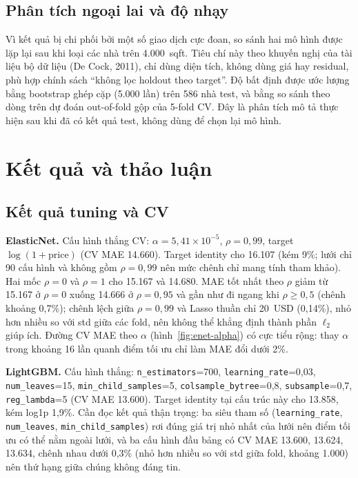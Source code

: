 \subsection{Phân tích ngoại lai và độ nhạy}

Vì kết quả bị chi phối bởi một số giao dịch cực đoan, so sánh hai mô hình được lặp lại sau khi loại các nhà trên
4.000~sqft. Tiêu chí này theo khuyến nghị của tài liệu bộ dữ liệu (De Cock, 2011), chỉ dùng diện tích, không dùng
giá hay residual, phù hợp chính sách ``không lọc holdout theo target''. Độ bất định được ước lượng bằng bootstrap
ghép cặp (5.000 lần) trên 586 nhà test, và bằng so sánh theo dòng trên dự đoán out-of-fold gộp của 5-fold CV. Đây
là phân tích mô tả thực hiện sau khi đã có kết quả test, không dùng để chọn lại mô hình.

\section{Kết quả và thảo luận}
\label{sec:results-b}

\subsection{Kết quả tuning và CV}

\textbf{ElasticNet.} Cấu hình thắng CV: $\alpha=5{,}41\times10^{-5}$, $\rho=0{,}99$, target $\log(1+\text{price})$
(CV MAE 14.660). Target identity cho 16.107 (kém 9\%; lưới chỉ 90 cấu hình và không gồm $\rho=0{,}99$ nên mức
chênh chỉ mang tính tham khảo). Hai mốc $\rho=0$ và $\rho=1$ cho 15.167 và 14.680. MAE tốt nhất theo $\rho$ giảm
từ 15.167 ở $\rho=0$ xuống 14.666 ở $\rho=0{,}95$ và gần như đi ngang khi $\rho\geq0{,}5$ (chênh khoảng 0,7\%);
chênh lệch giữa $\rho=0{,}99$ và Lasso thuần chỉ 20~USD (0,14\%), nhỏ hơn nhiều so với std giữa các fold, nên không
thể khẳng định thành phần $\ell_2$ giúp ích. Đường CV MAE theo $\alpha$ (hình~\ref{fig:enet-alpha}) có cực tiểu
rộng: thay $\alpha$ trong khoảng 16 lần quanh điểm tối ưu chỉ làm MAE đổi dưới 2\%.

\textbf{LightGBM.} Cấu hình thắng: \texttt{n\_estimators}=700, \texttt{learning\_rate}=0,03, \texttt{num\_leaves}=15,
\texttt{min\_child\_samples}=5, \texttt{colsample\_bytree}=0,8, \texttt{subsample}=0,7, \texttt{reg\_lambda}=5 (CV MAE
13.600). Target identity tại cấu trúc này cho 13.858, kém log1p 1,9\%. Cần đọc kết quả thận trọng: ba siêu tham số
(\texttt{learning\_rate}, \texttt{num\_leaves}, \texttt{min\_child\_samples}) rơi đúng giá trị nhỏ nhất của lưới nên
điểm tối ưu có thể nằm ngoài lưới, và ba cấu hình đầu bảng có CV MAE 13.600, 13.624, 13.634, chênh nhau dưới 0,3\%
(nhỏ hơn nhiều so với std giữa fold, khoảng 1.000) nên thứ hạng giữa chúng không đáng tin.

